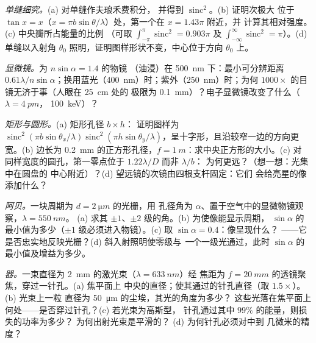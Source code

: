 \begin{exercise}[$\star\star$]\label{exo:b2:diffraction:5}
\emph{单缝细究。}(a) 对单缝作夫琅禾费积分，
并得到 $\operatorname{sinc}^2$。(b) 证明次极大
位于 $\tan x = x$（$x = \pi b\sin\theta/\lambda$）处，第一个在 $x = 1.43\pi$ 附近，并
计算其相对强度。(c) 中央瓣所占能量的比例
（可取 $\int_{-\pi}^\pi\operatorname{sinc}^2 = 0.903\pi$ 及
$\int_{-\infty}^\infty\operatorname{sinc}^2 = \pi$）。(d) 单缝以入射角
$\theta_0$ 照明，证明图样形状不变，中心位于方向 $\theta_0$ 上。
\end{exercise}

\begin{exercise}[$\star\star$]\label{exo:b2:diffraction:6}
\emph{显微镜。}为 $n\sin\alpha = 1.4$ 的物镜
（油浸）在 \qty{500}{nm} 下：最小可分辨距离 $0.61\lambda/n\sin
\alpha$；换用蓝光（\qty{400}{nm}）时；紫外（\qty{250}{nm}）时；为何
$1000\times$ 的目镜无济于事（人眼在 \qty{25}{cm} 处的
极限为 \qty{0.1}{mm}）？电子显微镜改变了什么（$\lambda = \qty{4}{pm}$，
\qty{100}{keV}）？
\end{exercise}

\begin{exercise}[$\star\star$]\label{exo:b2:diffraction:7}
\emph{矩形与圆形。}(a) 矩形孔径 $b \times h$：
证明图样为 $\operatorname{sinc}^2(\pi b\sin\theta_x/\lambda)\operatorname{sinc}^2(\pi h
\sin\theta_y/\lambda)$，呈十字形，且沿较窄一边的方向更宽。(b) 边长为
\qty{0.2}{mm} 的正方形孔径，$f = \qty{1}{m}$：求中央正方形的大小。(c) 对
同样宽度的圆孔，第一零点位于 $1.22\lambda/D$ 而非 $\lambda/b$：
为何更远？（想一想：光集中在圆盘的
中心附近）？(d) 望远镜的次镜由四根支杆固定：它们
会给亮星的像添加什么？
\end{exercise}

\begin{exercise}[$\star\star$]\label{exo:b2:diffraction:8}
\emph{阿贝。}一块周期为 $d = \qty{2}{\micro m}$ 的光栅，用
孔径角为 $\alpha$、置于空气中的显微物镜观察，$\lambda = \qty{550}{nm}$。
(a) 求其 $\pm1$、$\pm2$ 级的角。(b) 为使像能显示周期，
$\sin\alpha$ 的最小值为多少（$\pm1$ 级必须进入物镜）。(c) 取 $\sin\alpha = 0.4$：像呈现什么？
——它是否忠实地反映光栅？(d) 斜入射照明使零级与
\emph{一}个一级光通过，此时
$\sin\alpha$ 的最小值及增益为多少。
\end{exercise}

\begin{exercise}[$\star\star$]\label{exo:b2:diffraction:9}
\emph{器。}一束直径为 \qty{2}{mm} 的激光束（$\lambda = \qty{633}{nm}$）经
焦距为 $f = \qty{20}{mm}$ 的透镜聚焦，穿过一针孔。(a) 焦平面上
中央的直径；使其通过的针孔直径（取 $1.5\times$）。(b) 光束上一粒
直径为 \qty{50}{\micro m} 的尘埃，其光的角度为多少？
这些光落在焦平面上何处——是否穿过针孔？(c) 若光束为高斯型，
针孔通过其中 $99\%$ 的能量，则损失的功率为多少？
为何出射光束是平滑的？
(d) 为何针孔必须对中到
几微米的精度？
\end{exercise}

